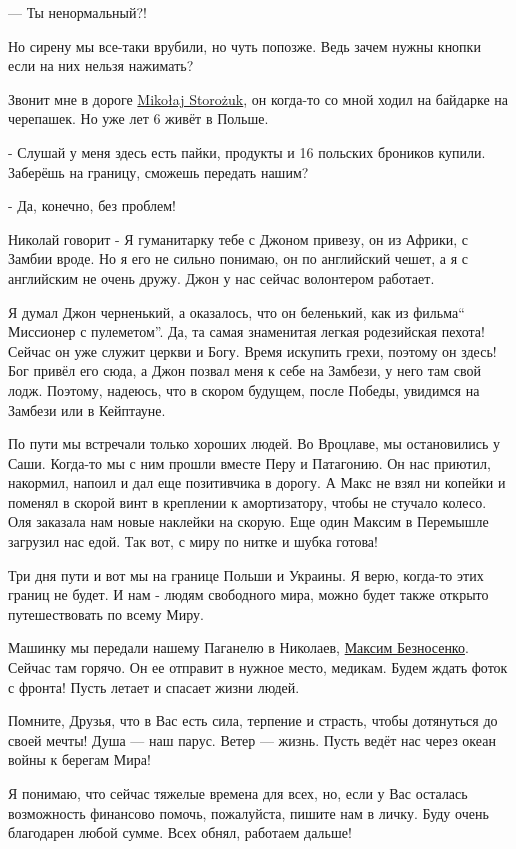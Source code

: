 — Ты ненормальный?! 

Но сирену мы все-таки врубили, но чуть попозже. Ведь зачем нужны кнопки если на
них нельзя нажимать?

Звонит мне в дороге
\href{https://www.facebook.com/profile.php?id=100004658208358}{Mikołaj
Storożuk}, он когда-то со мной ходил на байдарке на черепашек. Но уже лет 6
живёт в Польше.

- Слушай у меня здесь есть пайки, продукты и 16 польских броников купили. Заберёшь на границу, сможешь передать нашим? 

- Да, конечно, без проблем! 

Николай говорит - Я гуманитарку тебе с Джоном привезу, он из Африки, с Замбии
вроде. Но я его не сильно понимаю, он по английский чешет, а я с английским не
очень дружу. Джон у нас сейчас волонтером работает. 

Я думал Джон черненький, а оказалось, что он беленький, как из фильма\enquote{
Миссионер с пулеметом}. Да, та самая знаменитая легкая родезийская пехота!
Сейчас он уже служит церкви и Богу. Время искупить грехи, поэтому он здесь!
Бог привёл его сюда, а Джон позвал меня к себе на Замбези, у него там свой
лодж. Поэтому, надеюсь, что в скором будущем, после Победы, увидимся на Замбези
или в Кейптауне.

По пути мы встречали только хороших людей. Во Вроцлаве, мы остановились у Саши.
Когда-то мы с ним прошли вместе Перу и Патагонию. Он нас приютил, накормил,
напоил и дал еще позитивчика в дорогу.  А Макс не взял ни копейки и поменял в
скорой винт в креплении к амортизатору, чтобы не стучало колесо. Оля заказала
нам новые наклейки на скорую. Еще один Максим в Перемышле загрузил нас едой.
Так вот, с миру по нитке и шубка готова!

Три дня пути и вот мы на границе Польши и Украины. Я верю, когда-то этих границ
не будет. И нам - людям свободного мира, можно будет также открыто
путешествовать по всему Миру.  

Машинку мы передали нашему Паганелю в Николаев,
\href{https://www.facebook.com/maxim.beznosenko}{Максим Безносенко}. Сейчас там
горячо. Он ее отправит в нужное место, медикам. Будем ждать фоток с фронта!
Пусть летает и спасает жизни людей.

Помните, Друзья, что в Вас есть сила, терпение и страсть, чтобы дотянуться до
своей мечты!  Душа — наш парус. Ветер — жизнь. Пусть ведёт нас через океан
войны к берегам Мира! 

Я понимаю,  что сейчас тяжелые времена для всех, но, если у Вас осталась
возможность финансово помочь, пожалуйста, пишите нам в личку. Буду очень
благодарен любой сумме. Всех обнял, работаем дальше!

